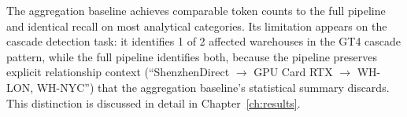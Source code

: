 The aggregation baseline achieves comparable token counts to the full pipeline and
identical recall on most analytical categories. Its limitation appears on the cascade
detection task: it identifies 1 of 2 affected warehouses in the GT4 cascade pattern,
while the full pipeline identifies both, because the pipeline preserves explicit
relationship context (``ShenzhenDirect $\to$ GPU Card RTX $\to$ WH-LON, WH-NYC'')
that the aggregation baseline's statistical summary discards. This distinction is
discussed in detail in Chapter~\ref{ch:results}.
